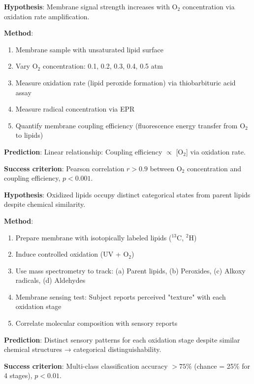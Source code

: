 \documentclass[11pt,a4paper]{article}
\theoremstyle{definition}
\theoremstyle{remark}
\begin{document}
\begin{experiment}
\textbf{Hypothesis}: Membrane signal strength increases with O$_2$ concentration via oxidation rate amplification.

\textbf{Method}:
\begin{enumerate}
\item Membrane sample with unsaturated lipid surface
\item Vary O$_2$ concentration: 0.1, 0.2, 0.3, 0.4, 0.5 atm
\item Measure oxidation rate (lipid peroxide formation) via thiobarbituric acid assay
\item Measure radical concentration via EPR
\item Quantify membrane coupling efficiency (fluorescence energy transfer from O$_2$ to lipids)
\end{enumerate}

\textbf{Prediction}: Linear relationship: Coupling efficiency $\propto$ [O$_2$] via oxidation rate.

\textbf{Success criterion}: Pearson correlation $r > 0.9$ between O$_2$ concentration and coupling efficiency, $p < 0.001$.
\end{experiment}

\begin{experiment}
\textbf{Hypothesis}: Oxidized lipids occupy distinct categorical states from parent lipids despite chemical similarity.

\textbf{Method}:
\begin{enumerate}
\item Prepare membrane with isotopically labeled lipids ($^{13}$C, $^2$H)
\item Induce controlled oxidation (UV + O$_2$)
\item Use mass spectrometry to track: (a) Parent lipids, (b) Peroxides, (c) Alkoxy radicals, (d) Aldehydes
\item Membrane sensing test: Subject reports perceived "texture" with each oxidation stage
\item Correlate molecular composition with sensory reports
\end{enumerate}

\textbf{Prediction}: Distinct sensory patterns for each oxidation stage despite similar chemical structures → categorical distinguishability.

\textbf{Success criterion}: Multi-class classification accuracy $>75\%$ (chance = 25\% for 4 stages), $p < 0.01$.
\end{experiment}
\end{document}
